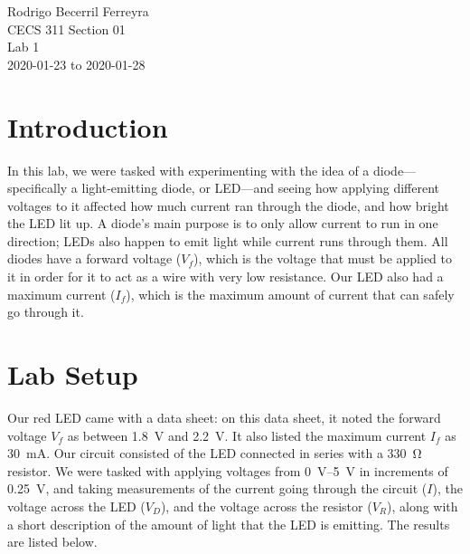 \documentclass{article}
\begin{document}
\begin{flushright}
    \noindent
    Rodrigo Becerril Ferreyra\\
    CECS 311 Section 01\\
    Lab 1\\
    2020-01-23 to 2020-01-28
\end{flushright}

\section{Introduction} In this lab, we were tasked with experimenting
with the idea of a diode---specifically a light-emitting
diode, or LED---and seeing how applying different voltages
to it affected how much current ran through the diode, and
how bright the LED lit up. A diode's main purpose is to
only allow current to run in one direction; LEDs also
happen to emit light while current runs through them. All
diodes have a forward voltage (\(V_f\)), which is the voltage
that must be applied to it in order for it to act as a wire
with very low resistance. Our LED also had a maximum current
(\(I_f\)), which is the maximum amount of current that
can safely go through it.

\section{Lab Setup} Our red LED came with a data sheet:
on this data sheet, it noted the forward voltage \(V_f\) as
between \SI{1.8}{\volt} and \SI{2.2}{V}. It also listed the
maximum current \(I_f\) as \SI{30}{mA}. Our circuit consisted
of the LED connected in series with a \SI{330}{\ohm} resistor.
We were tasked with applying voltages from \SI{0}{V}--\SI{5}{V}
in increments of \SI{0.25}{V}, and
taking measurements of
the current going through the circuit (\(I\)),
the voltage across the LED (\(V_D\)),
and the voltage across the resistor (\(V_R\)),
along with a short description of the
amount of light that the LED is emitting. The results are
listed below.
\end{document}
